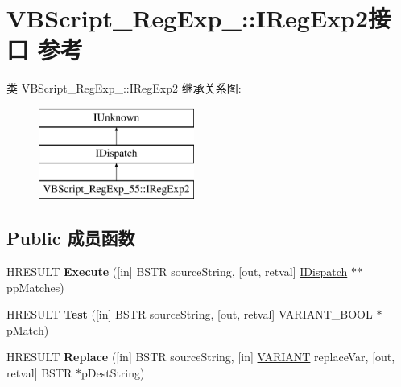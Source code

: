 \hypertarget{interface_v_b_script___reg_exp__55_1_1_i_reg_exp2}{}\section{V\+B\+Script\+\_\+\+Reg\+Exp\+\_\+:\+:I\+Reg\+Exp2接口 参考}
\label{interface_v_b_script___reg_exp__55_1_1_i_reg_exp2}
类 V\+B\+Script\+\_\+\+Reg\+Exp\+\_\+:\+:I\+Reg\+Exp2 继承关系图\+:\begin{figure}[H]
\begin{center}
\leavevmode
\includegraphics[height=3.000000cm]{interface_v_b_script___reg_exp__55_1_1_i_reg_exp2}
\end{center}
\end{figure}
\subsection*{Public 成员函数}
\begin{DoxyCompactItemize}
\item 
\mbox{\label{interface_v_b_script___reg_exp__55_1_1_i_reg_exp2_a9d604778e69291bc7254b4d8eb49251b}} 
H\+R\+E\+S\+U\+LT {\bfseries Execute} (\mbox{[}in\mbox{]} B\+S\+TR source\+String, \mbox{[}out, retval\mbox{]} \hyperlink{interface_i_dispatch}{I\+Dispatch} $\ast$$\ast$pp\+Matches)
\item 
\mbox{\label{interface_v_b_script___reg_exp__55_1_1_i_reg_exp2_afb2051be8a683fe7926379599ea4e594}} 
H\+R\+E\+S\+U\+LT {\bfseries Test} (\mbox{[}in\mbox{]} B\+S\+TR source\+String, \mbox{[}out, retval\mbox{]} V\+A\+R\+I\+A\+N\+T\+\_\+\+B\+O\+OL $\ast$p\+Match)
\item 
\mbox{\label{interface_v_b_script___reg_exp__55_1_1_i_reg_exp2_a5698f174e0b76d3c9b7ae51fbafd65b6}} 
H\+R\+E\+S\+U\+LT {\bfseries Replace} (\mbox{[}in\mbox{]} B\+S\+TR source\+String, \mbox{[}in\mbox{]} \hyperlink{structtag_v_a_r_i_a_n_t}{V\+A\+R\+I\+A\+NT} replace\+Var, \mbox{[}out, retval\mbox{]} B\+S\+TR $\ast$p\+Dest\+String)
\end{DoxyCompactItemize}
